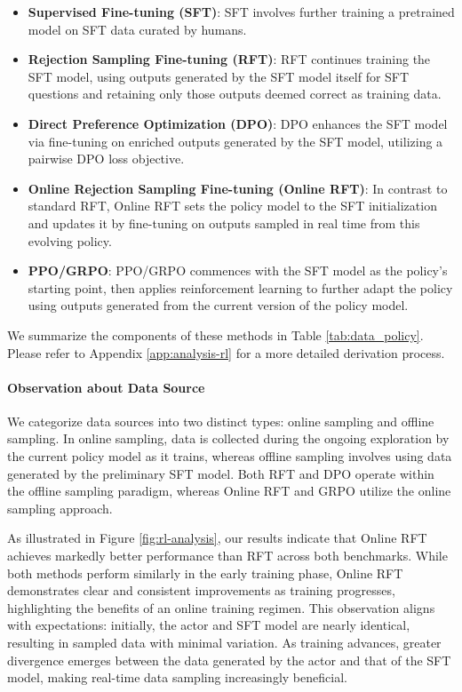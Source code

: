 \begin{itemize}[topsep=0pt]
\begin{itemize}[topsep=0pt]
\begin{itemize}
    \item  \textbf{Supervised Fine-tuning (SFT)}: SFT involves further training a pretrained model on SFT data curated by humans.
    \item \textbf{Rejection Sampling Fine-tuning (RFT)}: RFT continues training the SFT model, using outputs generated by the SFT model itself for SFT questions and retaining only those outputs deemed correct as training data.
    \item \textbf{Direct Preference Optimization (DPO)}: DPO enhances the SFT model via fine-tuning on enriched outputs generated by the SFT model, utilizing a pairwise DPO loss objective.
    \item \textbf{Online Rejection Sampling Fine-tuning (Online RFT)}: In contrast to standard RFT, Online RFT sets the policy model to the SFT initialization and updates it by fine-tuning on outputs sampled in real time from this evolving policy.
    \item \textbf{PPO/GRPO}: PPO/GRPO commences with the SFT model as the policy's starting point, then applies reinforcement learning to further adapt the policy using outputs generated from the current version of the policy model.
\end{itemize}

We summarize the components of these methods in Table \ref{tab:data_policy}.
Please refer to Appendix \ref{app:analysis-rl} for a more detailed derivation process.

\paragraph{Observation about Data Source} We categorize data sources into two distinct types: online sampling and offline sampling. In online sampling, data is collected during the ongoing exploration by the current policy model as it trains, whereas offline sampling involves using data generated by the preliminary SFT model. Both RFT and DPO operate within the offline sampling paradigm, whereas Online RFT and GRPO utilize the online sampling approach.

As illustrated in Figure \ref{fig:rl-analysis}, our results indicate that Online RFT achieves markedly better performance than RFT across both benchmarks. While both methods perform similarly in the early training phase, Online RFT demonstrates clear and consistent improvements as training progresses, highlighting the benefits of an online training regimen. This observation aligns with expectations: initially, the actor and SFT model are nearly identical, resulting in sampled data with minimal variation. As training advances, greater divergence emerges between the data generated by the actor and that of the SFT model, making real-time data sampling increasingly beneficial.


\end{itemize}
\end{itemize}
